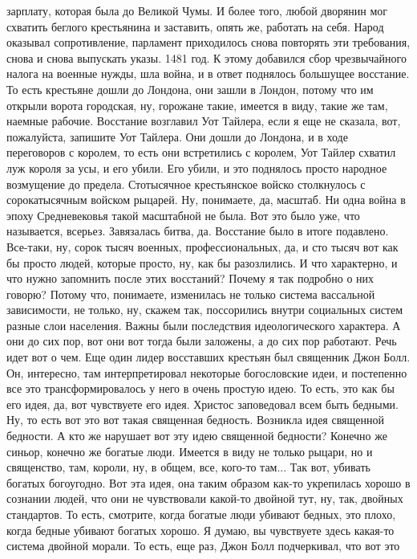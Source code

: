зарплату, которая была до Великой Чумы. И более того, любой дворянин мог
схватить беглого крестьянина и заставить, опять же, работать на себя. Народ
оказывал сопротивление, парламент приходилось снова повторять эти требования,
снова и снова выпускать указы. 1481 год. К этому добавился сбор чрезвычайного
налога на военные нужды, шла война, и в ответ поднялось большущее восстание. То
есть крестьяне дошли до Лондона, они зашли в Лондон, потому что им открыли
ворота городская, ну, горожане такие, имеется в виду, такие же там, наемные
рабочие. Восстание возглавил Уот Тайлера, если я еще не сказала, вот,
пожалуйста, запишите Уот Тайлера. Они дошли до Лондона, и в ходе переговоров с
королем, то есть они встретились с королем, Уот Тайлер схватил луж короля за
усы, и его убили. Его убили, и это поднялось просто народное возмущение до
предела. Стотысячное крестьянское войско столкнулось с сорокатысячным войском
рыцарей. Ну, понимаете, да, масштаб. Ни одна война в эпоху Средневековья такой
масштабной не была. Вот это было уже, что называется, всерьез. Завязалась битва,
да. Восстание было в итоге подавлено. Все-таки, ну, сорок тысяч военных,
профессиональных, да, и сто тысяч вот как бы просто людей, которые просто, ну,
как бы разозлились. И что характерно, и что нужно запомнить после этих
восстаний? Почему я так подробно о них говорю? Потому что, понимаете, изменилась
не только система вассальной зависимости, не только, ну, скажем так, поссорились
внутри социальных систем разные слои населения. Важны были последствия
идеологического характера. А они до сих пор, вот они вот тогда были заложены, а
до сих пор работают. Речь идет вот о чем. Еще один лидер восставших крестьян был
священник Джон Болл. Он, интересно, там интерпретировал некоторые богословские
идеи, и постепенно все это трансформировалось у него в очень простую идею. То
есть, это как бы его идея, да, вот чувствуете его идея. Христос заповедовал всем
быть бедными. Ну, то есть вот это вот такая священная бедность. Возникла идея
священной бедности. А кто же нарушает вот эту идею священной бедности? Конечно
же синьор, конечно же богатые люди. Имеется в виду не только рыцари, но и
священство, там, короли, ну, в общем, все, кого-то там... Так вот, убивать
богатых богоугодно. Вот эта идея, она таким образом как-то укрепилась хорошо в
сознании людей, что они не чувствовали какой-то двойной тут, ну, так, двойных
стандартов. То есть, смотрите, когда богатые люди убивают бедных, это плохо,
когда бедные убивают богатых хорошо. Я думаю, вы чувствуете здесь какая-то
система двойной морали. То есть, еще раз, Джон Болл подчеркивал, что вот это
